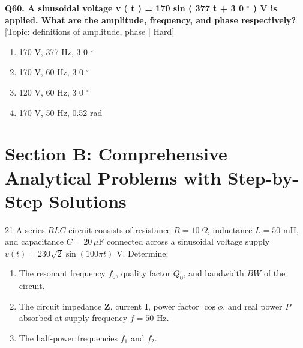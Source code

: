 \noindent\textbf{Q60. A sinusoidal voltage v ( t ) = 170 sin ( 377 t + 3 0 $^\circ$ ) V is applied. What are the amplitude, frequency, and phase respectively?} \hfill [Topic: definitions of amplitude, phase | Hard]
\begin{enumerate}[label=(\alph*),topsep=2pt,itemsep=1pt,partopsep=0pt,parsep=0pt]
    \item {170 V, 377 Hz, 3 0 $^\circ$}
    \item {170 V, 60 Hz, 3 0 $^\circ$}
    \item {120 V, 60 Hz, 3 0 $^\circ$}
    \item {170 V, 50 Hz, 0.52 rad}
\end{enumerate}
\vspace{2mm}


\newpage
\section{Section B: Comprehensive Analytical Problems with Step-by-Step Solutions}

\begin{subjectiveq}{2}{1}
A series $RLC$ circuit consists of resistance $R = 10\,\Omega$, inductance $L = 50\text{ mH}$, and capacitance $C = 20\,\mu\text{F}$ connected across a sinusoidal voltage supply $v(t) = 230\sqrt{2}\sin(100\pi t)\text{ V}$. Determine:\begin{enumerate}[label=(\alph*)]\item The resonant frequency $f_0$, quality factor $Q_0$, and bandwidth $BW$ of the circuit.\item The circuit impedance $\mathbf{Z}$, current $\mathbf{I}$, power factor $\cos\phi$, and real power $P$ absorbed at supply frequency $f = 50\text{ Hz}$.\item The half-power frequencies $f_1$ and $f_2$.\end{enumerate}
\end{subjectiveq}

